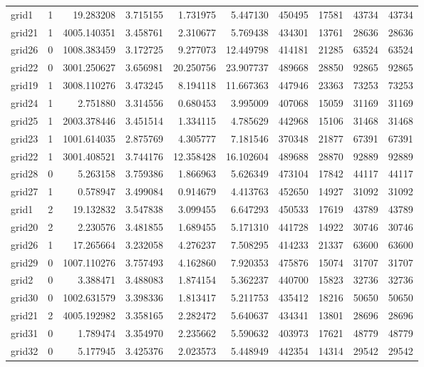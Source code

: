 \documentclass[../../../thesis.tex]{subfiles}
\begin{document}
\begin{longtable}{|l|r|r|r|r|r|r|r|r|r|}
grid1 & 1 & 19.283208 & 3.715155 & 1.731975 & 5.447130 & 450495 & 17581 & 43734 & 43734 \\
grid21 & 1 & 4005.140351 & 3.458761 & 2.310677 & 5.769438 & 434301 & 13761 & 28636 & 28636 \\
grid26 & 0 & 1008.383459 & 3.172725 & 9.277073 & 12.449798 & 414181 & 21285 & 63524 & 63524 \\
grid22 & 0 & 3001.250627 & 3.656981 & 20.250756 & 23.907737 & 489668 & 28850 & 92865 & 92865 \\
grid19 & 1 & 3008.110276 & 3.473245 & 8.194118 & 11.667363 & 447946 & 23363 & 73253 & 73253 \\
grid24 & 1 & 2.751880 & 3.314556 & 0.680453 & 3.995009 & 407068 & 15059 & 31169 & 31169 \\
grid25 & 1 & 2003.378446 & 3.451514 & 1.334115 & 4.785629 & 442968 & 15106 & 31468 & 31468 \\
grid23 & 1 & 1001.614035 & 2.875769 & 4.305777 & 7.181546 & 370348 & 21877 & 67391 & 67391 \\
grid22 & 1 & 3001.408521 & 3.744176 & 12.358428 & 16.102604 & 489688 & 28870 & 92889 & 92889 \\
grid28 & 0 & 5.263158 & 3.759386 & 1.866963 & 5.626349 & 473104 & 17842 & 44117 & 44117 \\
grid27 & 1 & 0.578947 & 3.499084 & 0.914679 & 4.413763 & 452650 & 14927 & 31092 & 31092 \\
grid1 & 2 & 19.132832 & 3.547838 & 3.099455 & 6.647293 & 450533 & 17619 & 43789 & 43789 \\
grid20 & 2 & 2.230576 & 3.481855 & 1.689455 & 5.171310 & 441728 & 14922 & 30746 & 30746 \\
grid26 & 1 & 17.265664 & 3.232058 & 4.276237 & 7.508295 & 414233 & 21337 & 63600 & 63600 \\
grid29 & 0 & 1007.110276 & 3.757493 & 4.162860 & 7.920353 & 475876 & 15074 & 31707 & 31707 \\
grid2 & 0 & 3.388471 & 3.488083 & 1.874154 & 5.362237 & 440700 & 15823 & 32736 & 32736 \\
grid30 & 0 & 1002.631579 & 3.398336 & 1.813417 & 5.211753 & 435412 & 18216 & 50650 & 50650 \\
grid21 & 2 & 4005.192982 & 3.358165 & 2.282472 & 5.640637 & 434341 & 13801 & 28696 & 28696 \\
grid31 & 0 & 1.789474 & 3.354970 & 2.235662 & 5.590632 & 403973 & 17621 & 48779 & 48779 \\
grid32 & 0 & 5.177945 & 3.425376 & 2.023573 & 5.448949 & 442354 & 14314 & 29542 & 29542 \\

\end{longtable}
\end{document}
